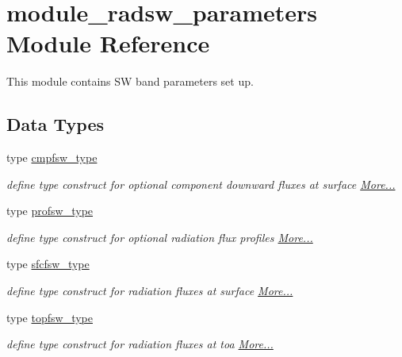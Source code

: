 \hypertarget{namespacemodule__radsw__parameters}{}\section{module\+\_\+radsw\+\_\+parameters Module Reference}
\label{namespacemodule__radsw__parameters}


This module contains SW band parameters set up.  


\subsection*{Data Types}
\begin{DoxyCompactItemize}
\item 
type \hyperlink{namespacemodule__radsw__parameters_structmodule__radsw__parameters_1_1cmpfsw__type}{cmpfsw\+\_\+type}
\begin{DoxyCompactList}\small\item\em define type construct for optional component downward fluxes at surface  \hyperlink{namespacemodule__radsw__parameters_structmodule__radsw__parameters_1_1cmpfsw__type}{More...}\end{DoxyCompactList}\item 
type \hyperlink{namespacemodule__radsw__parameters_structmodule__radsw__parameters_1_1profsw__type}{profsw\+\_\+type}
\begin{DoxyCompactList}\small\item\em define type construct for optional radiation flux profiles  \hyperlink{namespacemodule__radsw__parameters_structmodule__radsw__parameters_1_1profsw__type}{More...}\end{DoxyCompactList}\item 
type \hyperlink{namespacemodule__radsw__parameters_structmodule__radsw__parameters_1_1sfcfsw__type}{sfcfsw\+\_\+type}
\begin{DoxyCompactList}\small\item\em define type construct for radiation fluxes at surface  \hyperlink{namespacemodule__radsw__parameters_structmodule__radsw__parameters_1_1sfcfsw__type}{More...}\end{DoxyCompactList}\item 
type \hyperlink{namespacemodule__radsw__parameters_structmodule__radsw__parameters_1_1topfsw__type}{topfsw\+\_\+type}
\begin{DoxyCompactList}\small\item\em define type construct for radiation fluxes at toa  \hyperlink{namespacemodule__radsw__parameters_structmodule__radsw__parameters_1_1topfsw__type}{More...}\end{DoxyCompactList}\end{DoxyCompactItemize}
